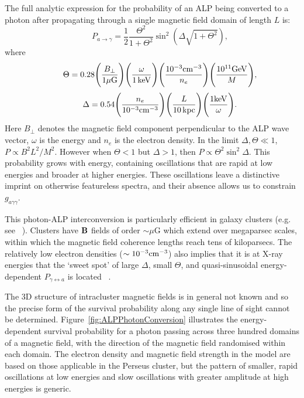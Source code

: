 \documentclass[fleqn,usenatbib,useAMS]{mnras}
\begin{document}
The full analytic expression for the probability of an ALP being converted to a photon after propagating through a single magnetic field domain of length $L$ is:
\begin{equation}
\qquad P_{a \rightarrow \gamma} = \frac{1}{2}\frac{\Theta^2}{1 + \Theta^2}\sin^2 \left( \Delta \sqrt{1 + \Theta^2} \right),
\end{equation}
where
\begin{equation}
\qquad \Theta = 0.28 \Bigg(\frac{B_{\perp}}{1 \mu\rm{G}}\Bigg)\Bigg(\frac{\omega}{1 \, \rm{keV}}\Bigg)\Bigg(\frac{10^{-3} \rm{cm}^{-3}}{n_e}\Bigg)\Bigg(\frac{10^{11} \rm{GeV}}{M}\Bigg),
\end{equation}
\begin{equation}
\qquad \Delta = 0.54 \Bigg(\frac{n_e}{10^{-3} \rm{cm}^{-3}}\Bigg)\Bigg(\frac{L}{10 \, \rm{kpc}}\Bigg)\Bigg(\frac{1 \rm{keV}}{\omega}\Bigg).
\end{equation}
Here $B_{\perp}$ denotes the magnetic field component perpendicular to the ALP wave vector, $\omega$ is the energy and $n_e$ is the electron density. In the limit $\Delta, \Theta \ll 1$, $P \propto B^2 L^2 / M^2$. However when $\Theta < 1$ but $\Delta > 1$, then
$ P \propto \Theta^2 \sin^2 \Delta$.
This probability grows with energy, containing oscillations that are rapid at low energies and broader at higher energies. These
oscillations leave a distinctive imprint on otherwise featureless spectra, and their absence allows us to constrain $g_{a\gamma\gamma}$.

This photon-ALP interconversion is particularly efficient in galaxy clusters (e.g. see ~\cite{0902.2320,1305.3603}).
Clusters have ${\bf B}$ fields of order $\sim \mu$G which extend over megaparsec scales, within which the magnetic field coherence lengths reach tens of kiloparsecs.
The relatively low electron densities ($\sim 10^{-3}\rm{cm}^{-3}$) also implies that it is at X-ray energies that the `sweet spot' of large
 $\Delta$, small $\Theta$, and  quasi-sinusoidal energy-dependent $P_{\gamma \leftrightarrow a}$ is located ~\cite{1304.0989, 1305.3603, 1312.3947, 1509.06748}.

The 3D structure of intracluster magnetic fields is in general not known and so
the precise form of the survival probability along any single line of sight cannot be determined. Figure~\ref{fig:ALPPhotonConversion} illustrates the energy-dependent survival probability for a photon passing across three hundred domains of a magnetic field, with the direction of the magnetic
field randomised within each domain. The electron density and magnetic field strength in
the model are based on those applicable in the Perseus cluster, but the pattern of smaller, rapid oscillations at low energies and slow oscillations with greater amplitude at high energies is generic.
\end{document}
